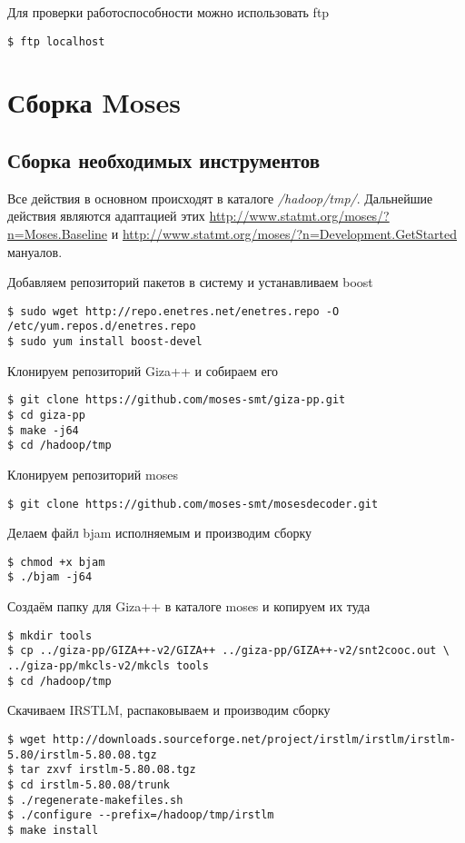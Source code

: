 Для проверки работоспособности можно использовать ftp
\begin{lstlisting}
$ ftp localhost
\end{lstlisting}

\section{Сборка Moses}
\subsection{Сборка необходимых инструментов}
Все действия в основном происходят в каталоге \emph{/hadoop/tmp/}. Дальнейшие действия являются 
адаптацией этих \url{http://www.statmt.org/moses/?n=Moses.Baseline} и 
\url{http://www.statmt.org/moses/?n=Development.GetStarted} мануалов.

Добавляем репозиторий пакетов в систему и устанавливаем boost
\begin{lstlisting}
$ sudo wget http://repo.enetres.net/enetres.repo -O /etc/yum.repos.d/enetres.repo
$ sudo yum install boost-devel
\end{lstlisting}

Клонируем репозиторий Giza++ и собираем его
\begin{lstlisting}
$ git clone https://github.com/moses-smt/giza-pp.git
$ cd giza-pp
$ make -j64
$ cd /hadoop/tmp
\end{lstlisting}

Клонируем репозиторий moses
\begin{lstlisting}
$ git clone https://github.com/moses-smt/mosesdecoder.git
\end{lstlisting}
Делаем файл bjam исполняемым и производим сборку
\begin{lstlisting}
$ chmod +x bjam
$ ./bjam -j64
\end{lstlisting}

Создаём папку для Giza++ в каталоге moses и копируем их туда
\begin{lstlisting}
$ mkdir tools
$ cp ../giza-pp/GIZA++-v2/GIZA++ ../giza-pp/GIZA++-v2/snt2cooc.out \
../giza-pp/mkcls-v2/mkcls tools
$ cd /hadoop/tmp
\end{lstlisting}

Скачиваем IRSTLM, распаковываем и производим сборку
\begin{lstlisting}
$ wget http://downloads.sourceforge.net/project/irstlm/irstlm/irstlm-5.80/irstlm-5.80.08.tgz
$ tar zxvf irstlm-5.80.08.tgz
$ cd irstlm-5.80.08/trunk
$ ./regenerate-makefiles.sh
$ ./configure --prefix=/hadoop/tmp/irstlm
$ make install
\end{lstlisting}


